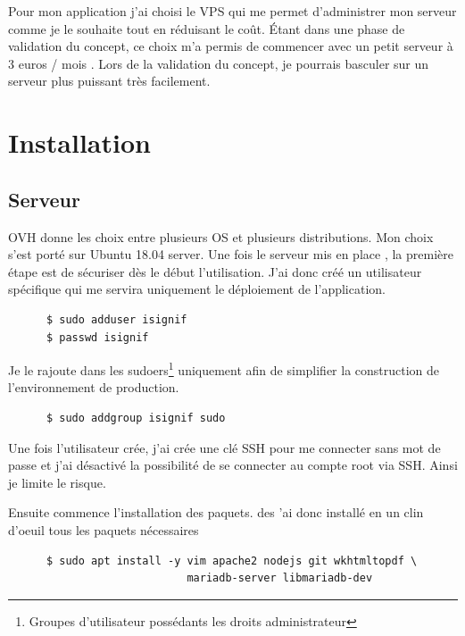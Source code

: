 \documentclass[]{report}
\begin{document}
      Pour mon application j’ai choisi le VPS qui me permet d’administrer mon serveur comme je le souhaite tout en réduisant le coût. Étant dans une phase de validation du concept, ce choix m’a permis de commencer avec un petit serveur à 3 euros / mois . Lors de la validation du concept, je pourrais basculer sur un serveur plus puissant très facilement.

  \section{Installation}

    \subsection{Serveur}

      OVH donne les choix entre plusieurs OS et plusieurs distributions. Mon choix s’est porté sur Ubuntu 18.04 server. Une fois le serveur mis en place , la première étape est de sécuriser dès le début l’utilisation. J’ai donc créé un utilisateur spécifique qui me servira uniquement le déploiement de l’application.

      \begin{scriptsize}
      \begin{verbatim}
      $ sudo adduser isignif
      $ passwd isignif
      \end{verbatim}
      \end{scriptsize}

      Je le rajoute dans les sudoers\footnote{Groupes d’utilisateur possédants les droits administrateur} uniquement afin de simplifier la construction de l’environnement de production.

      \begin{scriptsize}
      \begin{verbatim}
      $ sudo addgroup isignif sudo
      \end{verbatim}
      \end{scriptsize}

      Une fois l’utilisateur crée, j’ai crée une clé SSH pour me connecter sans mot de passe et j’ai désactivé la possibilité de se connecter au compte root via SSH. Ainsi je limite le risque.

      Ensuite commence l’installation des paquets. des ’ai donc installé en un clin d’oeuil tous les paquets nécessaires

      \begin{scriptsize}
      \begin{verbatim}
      $ sudo apt install -y vim apache2 nodejs git wkhtmltopdf \
                            mariadb-server libmariadb-dev
      \end{verbatim}
      \end{scriptsize}
\end{document}
